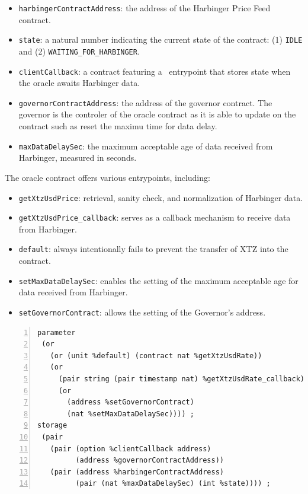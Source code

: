 \documentclass[a4paper,USenglish,cleveref, autoref,anonymous]{lipics-v2021}
\begin{document}
\begin{itemize}
\item \lstinline/harbingerContractAddress/: the address of the Harbinger Price Feed contract.
 \item    \lstinline/state/: a natural number indicating the current state of the contract: (1) \lstinline/IDLE/ and (2) \lstinline/WAITING_FOR_HARBINGER/.
 \item    \lstinline/clientCallback/: a contract featuring a \TNAT\ entrypoint that stores state when the oracle awaits Harbinger data.
 \item    \lstinline/governorContractAddress/: the address of the governor contract. The governor is the controler of the oracle contract as it is able to update on the contract such as reset the maximu time for data delay.  
 \item    \lstinline/maxDataDelaySec/: the maximum acceptable age of data received from Harbinger, measured in seconds.
\end{itemize}
The oracle contract offers various entrypoints, including:
\begin{itemize}
\item    \lstinline/getXtzUsdPrice/: retrieval, sanity check, and normalization of Harbinger data.
\item    \lstinline/getXtzUsdPrice_callback/: serves as a callback mechanism to receive data from Harbinger.
\item    \lstinline/default/: always intentionally fails to prevent the transfer of XTZ into the contract.
\item    \lstinline/setMaxDataDelaySec/: enables the setting of the maximum acceptable age for data received from Harbinger.
\item    \lstinline/setGovernorContract/: allows the setting of the Governor's address.
\end{itemize}

\begin{lstlisting}[float,captionpos=b,caption={Kolibri oracle contract},label={lst:kolibri-oracle-contract},numbers=left]
parameter
 (or
   (or (unit %default) (contract nat %getXtzUsdRate))
   (or
     (pair string (pair timestamp nat) %getXtzUsdRate_callback)
     (or
       (address %setGovernorContract) 
       (nat %setMaxDataDelaySec)))) ;
storage
 (pair
   (pair (option %clientCallback address) 
         (address %governorContractAddress))
   (pair (address %harbingerContractAddress) 
         (pair (nat %maxDataDelaySec) (int %state)))) ;
\end{lstlisting}
\end{document}
